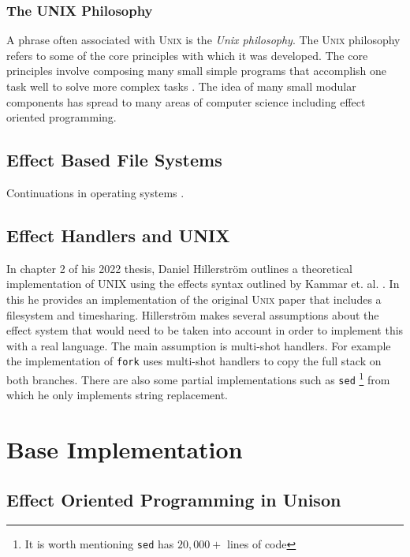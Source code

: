 \documentclass[logo,bsc,singlespacing,parskip]{infthesis}
\begin{document}
\subsection{The UNIX Philosophy}

A phrase often associated with \textsc{Unix} is the \emph{Unix philosophy}.  The
\textsc{Unix} philosophy refers to some of the core principles with which it was
developed. The core principles involve composing many small simple programs that
accomplish one task well to solve more complex tasks \cite{raymond2003art}. The
idea of many small modular components has spread to many areas of computer
science including effect oriented programming.

\section{Effect Based File Systems}

Continuations in operating systems \cite{DBLP:conf/context/KiselyovS07}.

\section{Effect Handlers and UNIX}

In chapter 2 of his 2022 thesis, Daniel Hillerstr\"{o}m
\cite{hillerstrom2022foundations} outlines a theoretical implementation of UNIX
using the effects syntax outlined by Kammar et. al. \cite{kammar2013handlers}.
In this he provides an implementation of the original \textsc{Unix} paper
\cite{ritchie1978unix} that includes a filesystem and timesharing.
Hillerstr\"{o}m makes several assumptions about the effect system that would
need to be taken into account in order to implement this with a real language.
The main assumption is multi-shot handlers. For example the implementation of
\texttt{fork} uses multi-shot handlers to copy the full stack on both branches.
There are also some partial implementations such as \texttt{sed} \footnote{It is
worth mentioning \texttt{sed} has $20,000+$ lines of code} from which he only
implements string replacement.

\chapter{Base Implementation}

\section{Effect Oriented Programming in Unison}
\end{document}
